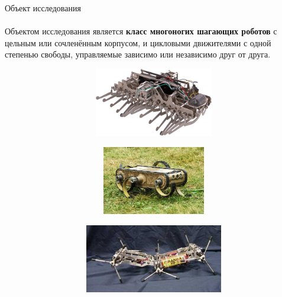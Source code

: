 \documentclass[aspectratio=169,xcolor=table]{beamer}
\begin{document}
\begin{frame}[t]{Объект исследования}
    \framesubtitle{}
    Объектом исследования является \textbf{класс многоногих шагающих роботов} с цельным или сочленённым корпусом, и цикловыми движителями с одной степенью свободы, управляемые зависимо или независимо друг от друга.

    \begin{figure}[H]
        \begin{subfigure}{0.32\textwidth}
            \centering\includegraphics[height=3cm,width=1\textwidth,keepaspectratio]{from_master/gakken.jpg}
            \label{fig:from_master/gakken.jpg}
        \end{subfigure}
        \begin{subfigure}{0.32\textwidth}
            \centering\includegraphics[height=3cm,width=1\textwidth,keepaspectratio]{from_master/rhex.jpg}
            \label{fig:from_master/rhex.jpg}
        \end{subfigure}
        \begin{subfigure}{0.32\textwidth}
            \centering\includegraphics[height=3cm,width=1\textwidth,keepaspectratio]{from_master/whegs2.jpg}
            \label{fig:from_master/whegs2.jpg}
        \end{subfigure}
    \end{figure}
\end{frame}
\end{document}
